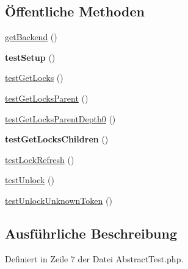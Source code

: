 \subsection*{Öffentliche Methoden}
\begin{DoxyCompactItemize}
\item 
\mbox{\hyperlink{class_sabre_1_1_d_a_v_1_1_locks_1_1_backend_1_1_abstract_test_a4d379922d4a8cf5c48c7530c53d3377d}{get\+Backend}} ()
\item 
\mbox{\label{class_sabre_1_1_d_a_v_1_1_locks_1_1_backend_1_1_abstract_test_a55164103e98c82ec17b6a0d3a3a8249d}} 
{\bfseries test\+Setup} ()
\item 
\mbox{\hyperlink{class_sabre_1_1_d_a_v_1_1_locks_1_1_backend_1_1_abstract_test_a623b823f15f7d0866c733f86540577c2}{test\+Get\+Locks}} ()
\item 
\mbox{\hyperlink{class_sabre_1_1_d_a_v_1_1_locks_1_1_backend_1_1_abstract_test_a333345fe9a27585a0490cf6fe878ab3d}{test\+Get\+Locks\+Parent}} ()
\item 
\mbox{\hyperlink{class_sabre_1_1_d_a_v_1_1_locks_1_1_backend_1_1_abstract_test_ad54ba301f7fa5c6b9c9863f1580072be}{test\+Get\+Locks\+Parent\+Depth0}} ()
\item 
\mbox{\label{class_sabre_1_1_d_a_v_1_1_locks_1_1_backend_1_1_abstract_test_a9c6346bbd49cf9ed39b2f7cc4b7c193c}} 
{\bfseries test\+Get\+Locks\+Children} ()
\item 
\mbox{\hyperlink{class_sabre_1_1_d_a_v_1_1_locks_1_1_backend_1_1_abstract_test_ac6f9b7200c9b872b3dfe7b6bb4f7eab0}{test\+Lock\+Refresh}} ()
\item 
\mbox{\hyperlink{class_sabre_1_1_d_a_v_1_1_locks_1_1_backend_1_1_abstract_test_a22173248318c55ded0443f45605e089e}{test\+Unlock}} ()
\item 
\mbox{\hyperlink{class_sabre_1_1_d_a_v_1_1_locks_1_1_backend_1_1_abstract_test_a835178058670ffbae40e7b2b88e6946d}{test\+Unlock\+Unknown\+Token}} ()
\end{DoxyCompactItemize}


\subsection{Ausführliche Beschreibung}


Definiert in Zeile 7 der Datei Abstract\+Test.\+php.




